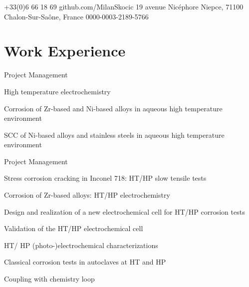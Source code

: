 \documentclass[11pt, a4paper, notitlepage]{article}
\begin{document}
\selectfont
\pagestyle{empty}
		
	
	
	{+33(0)6 66 18 69}
	{github.com/MilanSkocic}
	{19 avenue Nicéphore Niepce, 71100 Chalon-Sur-Saône, France}
	{0000-0003-2189-5766}
	
	
	\section*{Work Experience}
		\begin{jobdetails}
			\item Project Management
			\item High temperature electrochemistry
			\item Corrosion of Zr-based and Ni-based alloys in aqueous high temperature environment
            \item SCC of Ni-based alloys and stainless steels in aqueous high temperature environment
		\end{jobdetails}
		
		\begin{jobdetails}
			\item Project Management
			\item Stress corrosion cracking in Inconel 718: HT/HP slow tensile tests
			\item Corrosion of Zr-based alloys: HT/HP electrochemistry
		\end{jobdetails}

		\begin{jobdetails}
			\item Design and realization of a new electrochemical cell for HT/HP corrosion tests
			\item Validation of the HT/HP electrochemical cell
			\item HT/ HP (photo-)electrochemical characterizations
			\item Classical corrosion tests in autoclaves at HT and HP
			\item Coupling with chemistry loop
		\end{jobdetails}
\end{document}
